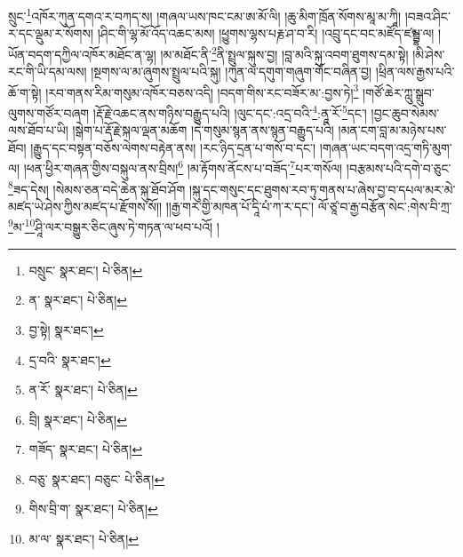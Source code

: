 སྲུང་\footnote{བསྲུང་  སྣར་ཐང་།  པེ་ཅིན། }འཁོར་ཀུན་དགའ་ར་བཀད་ས། །གཞལ་ཡས་ཁང་ངམ་ཨ་མོ་ལི། །ཆུ་མིག་ཁྲོན་སོགས་མཱ་མ་ཀཱི། །བཟའ་ཤིང་ར་དང་ལྡུམ་ར་སོགས། །ཤིང་གི་ལྷ་མོ་འོད་འཆང་མས། །ཕྱུགས་ལྷས་པརྞ་ཤ་བ་རི། །འབྲུ་དང་བང་མཛོད་ཛམྦྷ་ལ། །ཡོན་བདག་དཀྱིལ་འཁོར་མཐོང་ན་ལྷ། །མ་མཐོང་ནི་\footnote{ན་  སྣར་ཐང་།  པེ་ཅིན། }ནི་སྤྲུལ་སྐུས་བྱ། །བླ་མའི་སྐུ་འབག་ཐུགས་དམ་སྟེ། །མི་ཤེས་རང་གི་ཡི་དམ་ལས། །སྔགས་ལ་མ་ཞུགས་སྤྲུལ་པའི་སྐུ། །ཀུན་ལ་དགུག་གཞུག་གོང་བཞིན་བྱ། །ཕྲིན་ལས་རྒྱས་པའི་ཆོ་ག་སྟེ། །རབ་གནས་རིམ་གསུམ་འཁོར་བཅས་འདི། །བདག་གིས་རང་བཟོར་མ་:བྱས་ཏེ།\footnote{བྱ་སྟེ།  སྣར་ཐང་། } །གཙོ་ཆེར་ཀླུ་སྒྲུབ་ལུགས་གཙོར་བཞག །རྡོ་རྗེ་འཆང་ནས་གཉིས་བརྒྱུད་པའི། །ལུང་དང་:འདྲ་བའི་\footnote{དྲ་བའི་  སྣར་ཐང་། }:ནཱ་རོ་\footnote{ན་རོ་  སྣར་ཐང་།  པེ་ཅིན། }དང་། །བྱང་ཆུབ་སེམས་ལས་ཐོབ་པ་ཡི། །སྒེག་པ་རྡོ་རྗེ་སྐལ་ལྡན་མཆོག །དེ་གསུམ་སྙན་ནས་སྙན་བརྒྱུད་པའི། །མན་ངག་བླ་མ་མཉེས་པས་ཐོབ། །རྒྱུད་དང་བསྟན་བཅོས་ལེགས་བརྟེན་ནས། །རང་ཉིད་དྲན་པ་གསོ་བ་དང་། །གཞན་ཡང་བདག་འདྲ་གཏི་མུག་ལ། །ཕན་ཕྱིར་གཞན་གྱིས་བསྐུལ་ནས་བྲིས།\footnote{བྲི།  སྣར་ཐང་།  པེ་ཅིན། } །མ་རྟོགས་ནོངས་པ་བཟོད་\footnote{གཟོད་  སྣར་ཐང་།  པེ་ཅིན། }པར་གསོལ། །བརྩམས་པའི་དགེ་བ་ཅུང་\footnote{བཅུ་  སྣར་ཐང་། བཅུང་  པེ་ཅིན། }ཟད་དེས། །སེམས་ཅན་བདེ་ཆེན་སྐུ་ཐོབ་ཤོག །སྐུ་དང་གསུང་དང་ཐུགས་རབ་ཏུ་གནས་པ་ཞེས་བྱ་བ་དཔལ་མར་མེ་མཛད་ཡེ་ཤེས་ཀྱིས་མཛད་པ་རྫོགས་སོ།། །།རྒྱ་གར་གྱི་མཁན་པོ་དཱི་པཾ་ཀ་ར་དང་། ལོ་ཙཱ་བ་རྒྱ་བརྩོན་སེང་:གེས་བི་ཀྲ་\footnote{གིས་བྲི་ག་  སྣར་ཐང་།  པེ་ཅིན། }མ་\footnote{མ་ལ་  སྣར་ཐང་།  པེ་ཅིན། }ཤཱི་ལར་བསྒྱུར་ཅིང་ཞུས་ཏེ་གཏན་ལ་ཕབ་པའོ། ། 